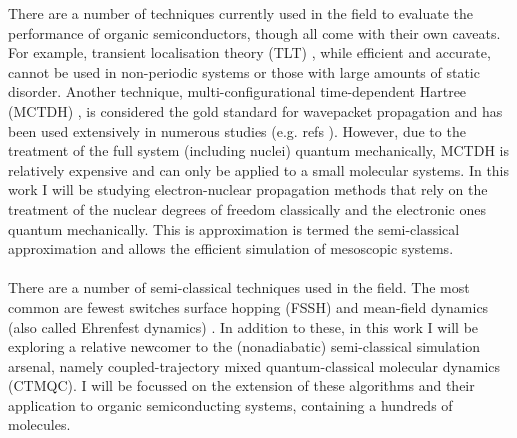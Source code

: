 There are a number of techniques currently used in the field to evaluate the performance of organic semiconductors, though all come with their own caveats. For example, transient localisation theory (TLT) \cite{Nematiaram2019, PhysRevB.83.081202, Fratini_2016}, while efficient and accurate, cannot be used in non-periodic systems or those with large amounts of static disorder. Another technique, multi-configurational time-dependent Hartree (MCTDH) \cite{MCTDH, cattarius_all_2001}, is considered the gold standard for wavepacket propagation and has been used extensively in numerous studies (e.g. refs \cite{MANTHE19937,doi:10.1063/1.463332,doi:10.1063/1.469292}). However, due to the treatment of the full system  (including nuclei) quantum mechanically, MCTDH is relatively expensive and can only be applied to a small molecular systems. In this work I will be studying electron-nuclear propagation methods that rely on the treatment of the nuclear degrees of freedom classically and the electronic ones quantum mechanically. This is approximation is termed the semi-classical approximation and allows the efficient simulation of mesoscopic systems.
\\\\
There are a number of semi-classical techniques used in the field. The most common are fewest switches surface hopping (FSSH) \cite{FSSH_orig} and mean-field dynamics (also called Ehrenfest dynamics) \cite{Ehrenfest1927}. In addition to these, in this work I will be exploring a relative newcomer to the (nonadiabatic) semi-classical simulation arsenal, namely coupled-trajectory mixed quantum-classical molecular dynamics (CTMQC). I will be focussed on the extension of these algorithms and their application to organic semiconducting systems, containing a hundreds of molecules.


